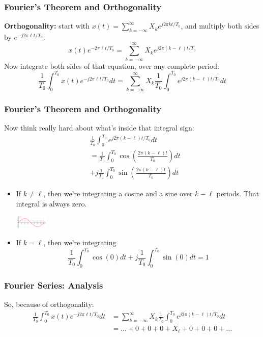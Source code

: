 \documentclass{beamer}
\begin{document}
\begin{frame}
  \frametitle{Fourier's Theorem and Orthogonality}

  {\bf Orthogonality:} start with $x(t) = \sum_{k=-\infty}^\infty X_k
  e^{j2\pi kt/T_0}$, and multiply both sides by $e^{-j2\pi \ell
    t/T_0}$:
  \[
  x(t)e^{-2\pi\ell t/T_0} = \sum_{k=-\infty}^\infty X_k e^{j2\pi (k-\ell)t/T_0}
  \]
  Now integrate both sides of that equation, over any complete period:
  \[
  \frac{1}{T_0}\int_0^{T_0}x(t)e^{-j2\pi\ell t/T_0}dt =
  \sum_{k=-\infty}^\infty X_k \frac{1}{T_0}\int_0^{T_0} e^{j2\pi (k-\ell)t/T_0}dt
  \]
\end{frame}

\begin{frame}
  \frametitle{Fourier's Theorem and Orthogonality}

  Now think really hard about what's inside that integral sign:
  \begin{align*}
    &\frac{1}{T_0}\int_0^{T_0} e^{j2\pi (k-\ell)t/T_0}dt\\
    &=\frac{1}{T_0}\int_0^{T_0}\cos\left(\frac{2\pi(k-\ell)t}{T_0}\right)dt\\
    &+j\frac{1}{T_0}\int_0^{T_0}\sin\left(\frac{2\pi (k-\ell)t}{T_0}\right)dt
  \end{align*}
  \begin{itemize}
  \item If $k\ne\ell$, then we're integrating a cosine and a sine over
    $k-\ell$ periods.  That integral is always zero.
    \centerline{\includegraphics[height=0.25in]{Sine_one_period.png}}
  \item If $k=\ell$, then we're integrating
    \[
    \frac{1}{T_0}\int_0^{T_0}\cos(0)dt+
    j\frac{1}{T_0}\int_0^{T_0}\sin(0)dt = 1
    \]
  \end{itemize}
\end{frame}

\begin{frame}
  \frametitle{Fourier Series: Analysis}

  So, because of orthogonality:
  \begin{align*}
  \frac{1}{T_0}\int_0^{T_0}x(t)e^{-j2\pi\ell t/T_0}dt &=
  \sum_{k=-\infty}^\infty X_k \frac{1}{T_0}\int_0^{T_0} e^{j2\pi (k-\ell)t/T_0}dt\\
  &= \ldots + 0 + 0 + 0 + X_\ell + 0 +0 + 0 + \ldots
  \end{align*}
  
\end{frame}  
\end{document}
